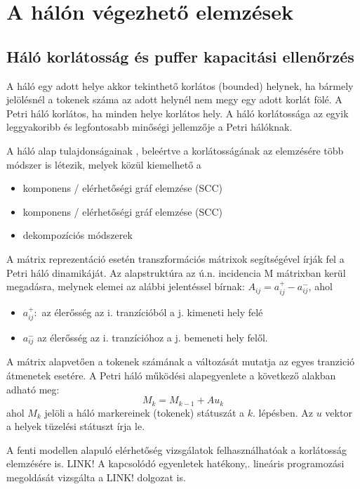 \chapter{A hálón végezhető elemzések}
\section{Háló korlátosság és puffer kapacitási ellenőrzés}

A háló egy adott helye akkor tekinthető korlátos (bounded) helynek, ha bármely jelölésnél a tokenek száma az adott helynél nem megy egy adott korlát fölé. A Petri háló korlátos, ha minden helye korlátos hely.
A háló korlátossága az egyik leggyakoribb és legfontosabb minőségi jellemzője a Petri hálóknak. 

A háló alap tulajdonságainak , beleértve a korlátosságának az elemzésére több módszer is létezik, melyek közül kiemelhető a
\begin{itemize}
\item komponens / elérhetőségi gráf elemzése (SCC)
\item komponens / elérhetőségi gráf elemzése (SCC)
\item dekompozíciós módszerek 
\end{itemize}

A mátrix reprezentáció esetén transzformációs mátrixok segítségével írják fel a Petri háló dinamikáját. Az alapstruktúra az ú.n. incidencia M mátrixban kerül megadásra, melynek elemei az alábbi jelentéssel bírnak: $A_{ij}=a^+_{ij}-a^-_{ij}$, ahol 
\begin{itemize}
\item $a^+_{ij}: $ az élerősség az i. tranzícióból a j. kimeneti hely felé
\item $a^-_{ij}$ az élerősség az i. tranzícióhoz a j. bemeneti hely felől.
\end{itemize}

A mátrix alapvetően a tokenek számának a változását mutatja az egyes tranzició átmenetek esetére. A  Petri háló működési alapegyenlete a következő alakban adható meg: 
$$M_k=M_{k-1}+ Au_k$$
ahol $M_k$ jelöli a háló markereinek (tokenek) státuszát a $k.$ lépésben. Az $u$ vektor a helyek tüzelési státuszt írja le. 

A fenti modellen alapuló elérhetőség vizsgálatok felhasználhatóak a korlátosság elemzésére is. LINK!%
A kapcsolódó  egyenletek hatékony,. lineáris programozási megoldását vizsgálta a LINK!  
dolgozat is.

